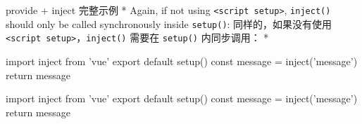 \begin{paracol}{2}
{provide + inject 完整示例}
\switchcolumn[0]*%
Again, if not using \texttt{\textless{}script\ setup\textgreater{}},
\texttt{inject()} should only be called synchronously inside
\texttt{setup()}:
\switchcolumn
同样的，如果没有使用
\texttt{\textless{}script\ setup\textgreater{}}，\texttt{inject()}
需要在 \texttt{setup()} 内同步调用：
\switchcolumn[0]*%
\begin{codeJs}
import { inject } from 'vue'
export default {
  setup() {
    const message = inject('message')
    return { message }
  }
}
\end{codeJs}
\switchcolumn
\begin{codeJs}
import { inject } from 'vue'
export default {
  setup() {
    const message = inject('message')
    return { message }
  }
}
\end{codeJs}
\end{paracol}

